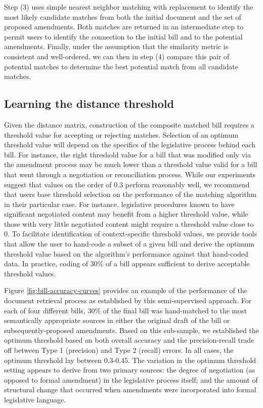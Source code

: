 \documentclass[11pt]{article}
\begin{document}
Step (3) uses simple nearest neighbor matching with replacement to
identify the most likely candidate matches from both the initial
document and the set of proposed amendments. Both matches are returned in an
intermediate step to permit users to identify the connection to the
initial bill and to the potential amendments. Finally, under the
assumption that the similarity metric is consistent and well-ordered, we can then in step (4) compare
this pair of potential matches to determine the best potential match
from all candidate matches. 


\subsection{Learning the distance threshold}
\label{sec:learn-dist-thresh}

Given the distance matrix, construction of the composite matched bill
requires a threshold value for accepting or rejecting matches. Selection of an optimum threshold value will depend on the specifics
of the legislative process behind each bill. For instance, the right
threshold value for a bill that was modified only via the amendment
process may be much lower than a threshold value valid for a bill that
went through a negotiation or reconciliation process. While our experiments
suggest that values on the order of 0.3 perform reasonably well, we
recommend that users base threshold selection on the performance of
the matching algorithm in their particular case. For instance,
legislative procedures known to have significant negotiated content
may benefit from a higher threshold value, while those with very
little negotiated content might require a threshold value close to
0. To facilitate identification of context-specific threshold values, we provide tools that allow the user to
hand-code a subset of a given bill and derive the optimum threshold
value based on the algorithm's performance against that hand-coded
data. In practice, coding of 30\% of a bill appears sufficient to
derive acceptable threshold values.

Figure \ref{fig:bill-accuracy-curves} provides an example of the
performance of the document retrieval process as established by this
semi-supervised approach. For each of four different bills, 30\% of
the final bill was hand-matched to the most semantically appropriate
sources in either the original draft of the bill or
subsequently-proposed amendments. Based on this sub-sample, we
established the optimum threshold based on both overall accuracy and
the precision-recall trade off between Type 1 (precision) and Type 2
(recall) errors. In all cases, the optimum threshold lay between
0.3-0.45. The variation in the optimum threshold setting appears to
derive from two primary sources: the degree of negotiation (as opposed
to formal amendment) in the legislative process itself; and the amount
of structural change that occurred when amendments were incorporated
into formal legislative language.
\end{document}
